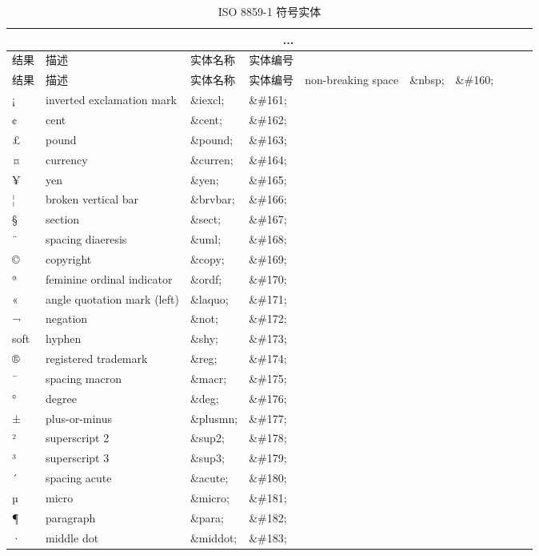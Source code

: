 \begin{longtable}{|p{60pt}|p{120pt}|p{60pt}|p{60pt}|}
\tabularnewline\hline
结果		&描述	&实体名称	&实体编号
\endhead


\caption{ISO 8859-1 符号实体}\\
\hline
结果		&描述	&实体名称	&实体编号
\endfirsthead

\endfoot


\endlastfoot

\hline
		&non-breaking space		&\&nbsp;		&\&\#160;\\
\hline
¡		&inverted exclamation mark	&\&iexcl;		&\&\#161;\\
\hline
¢		& cent					&\&cent;		&\&\#162;\\
\hline
£		&pound					&\&pound;	&\&\#163;\\
\hline
¤		&currency				&\&curren;	&\&\#164;\\
\hline
¥		&yen					&\&yen;		&\&\#165;\\
\hline
¦		&broken vertical bar		&\&brvbar;	&\&\#166;\\
\hline
§		&section					&\&sect;		&\&\#167;\\
\hline
¨		&spacing diaeresis			&\&uml;		&\&\#168;\\
\hline
©		&copyright				&\&copy;		&\&\#169;\\
\hline
ª		&feminine ordinal indicator	&\&ordf;		&\&\#170;\\
\hline
«		&angle quotation mark (left)	&\&laquo;	&\&\#171;\\
\hline
¬		&negation				&\&not;		&\&\#172;\\
\hline
soft 		&hyphen					&\&shy;		&\&\#173;\\
\hline
®		&registered trademark		&\&reg;		&\&\#174;\\
\hline
¯		&spacing macron			&\&macr;		&\&\#175;\\
\hline
°		&degree					&\&deg;		&\&\#176;\\
\hline
±		&plus-or-minus 			&\&plusmn;	&\&\#177;\\
\hline
²		&superscript 2			&\&sup2;		&\&\#178;\\
\hline
³		&superscript 3			&\&sup3;		&\&\#179;\\
\hline
´		&spacing acute			&\&acute;	&\&\#180;\\
\hline
µ		&micro					&\&micro;	&\&\#181;\\
\hline
¶		&paragraph				&\&para;		&\&\#182;\\
\hline
·		&middle dot				&\&middot;	&\&\#183;\\

\end{longtable}
